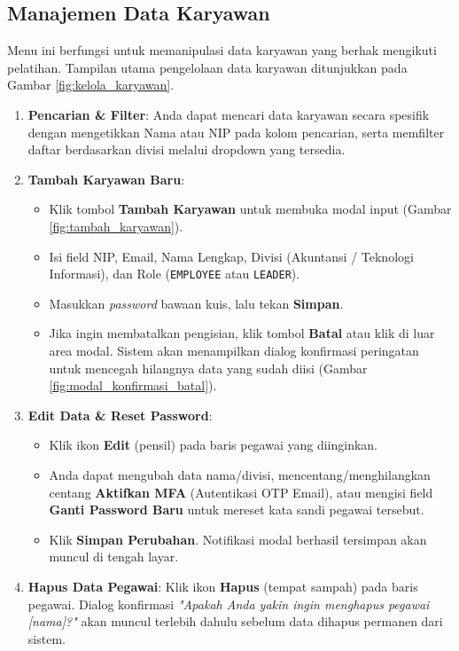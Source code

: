 \subsection{Manajemen Data Karyawan}
Menu ini berfungsi untuk memanipulasi data karyawan yang berhak mengikuti pelatihan. Tampilan utama pengelolaan data karyawan ditunjukkan pada Gambar \ref{fig:kelola_karyawan}.
\begin{enumerate}
    \item \textbf{Pencarian \& Filter}: Anda dapat mencari data karyawan secara spesifik dengan mengetikkan Nama atau NIP pada kolom pencarian, serta memfilter daftar berdasarkan divisi melalui dropdown yang tersedia.
    \item \textbf{Tambah Karyawan Baru}: 
    \begin{itemize}
        \item Klik tombol \textbf{Tambah Karyawan} untuk membuka modal input (Gambar \ref{fig:tambah_karyawan}).
        \item Isi field NIP, Email, Nama Lengkap, Divisi (Akuntansi / Teknologi Informasi), dan Role (\texttt{EMPLOYEE} atau \texttt{LEADER}).
        \item Masukkan \textit{password} bawaan kuis, lalu tekan \textbf{Simpan}.
        \item Jika ingin membatalkan pengisian, klik tombol \textbf{Batal} atau klik di luar area modal. Sistem akan menampilkan dialog konfirmasi peringatan untuk mencegah hilangnya data yang sudah diisi (Gambar \ref{fig:modal_konfirmasi_batal}).
    \end{itemize}
    \item \textbf{Edit Data \& Reset Password}:
    \begin{itemize}
        \item Klik ikon \textbf{Edit} (pensil) pada baris pegawai yang diinginkan.
        \item Anda dapat mengubah data nama/divisi, mencentang/menghilangkan centang \textbf{Aktifkan MFA} (Autentikasi OTP Email), atau mengisi field \textbf{Ganti Password Baru} untuk mereset kata sandi pegawai tersebut.
        \item Klik \textbf{Simpan Perubahan}. Notifikasi modal berhasil tersimpan akan muncul di tengah layar.
    \end{itemize}
    \item \textbf{Hapus Data Pegawai}: Klik ikon \textbf{Hapus} (tempat sampah) pada baris pegawai. Dialog konfirmasi \textit{"Apakah Anda yakin ingin menghapus pegawai [nama]?"} akan muncul terlebih dahulu sebelum data dihapus permanen dari sistem.
\end{enumerate}

